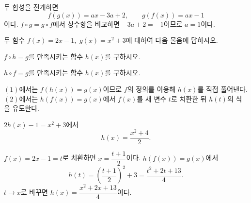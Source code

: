\documentclass[10pt]{article}
\begin{document}
\begin{dmsolution}
두 합성을 전개하면
\begin{equation*}
  f(g(x)) = ax - 3a + 2,\qquad g(f(x)) = ax - 1
\end{equation*}
이다. $f \circ g = g \circ f$에서 상수항을 비교하면 $-3a + 2 = -1$이므로 $a = 1$이다.
\end{dmsolution}

\dmchecktitle



\newpage


\begin{dmproblem}
두 함수 $f(x) = 2x - 1$,\ $g(x) = x^{2} + 3$에 대하여 다음 물음에 답하시오.

\vspace{3mm}
 $f \circ h = g$를 만족시키는 함수 $h(x)$를 구하시오.

\vspace{3mm}
 $h \circ f = g$를 만족시키는 함수 $h(x)$를 구하시오.
\end{dmproblem}

\begin{dmapproach}
$(1)$에서는 $f(h(x)) = g(x)$이므로 $f$의 정의를 이용해 $h(x)$를 직접 풀어낸다. $(2)$에서는 $h(f(x)) = g(x)$에서 $f(x)$를 새 변수 $t$로 치환한 뒤 $h(t)$의 식을 유도한다.
\end{dmapproach}

\begin{dmsolution}
 $2 h(x) - 1 = x^{2} + 3$에서
\[ h(x) = \dfrac{x^{2} + 4}{2}. \]

\vspace{3mm}
 $f(x) = 2x - 1 = t$로 치환하면 $x = \dfrac{t + 1}{2}$이다. $h(f(x)) = g(x)$에서
\begin{equation*}
  h(t) = \left(\frac{t + 1}{2}\right)^{2} + 3 = \frac{t^{2} + 2t + 13}{4}.
\end{equation*}
$t \to x$로 바꾸면 $h(x) = \dfrac{x^{2} + 2x + 13}{4}$이다.
\end{dmsolution}
\end{document}
